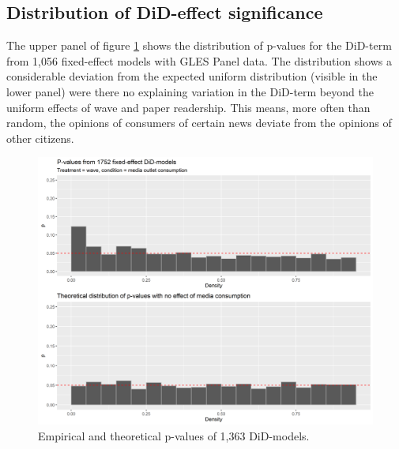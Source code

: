 \documentclass{article}
\begin{document}
\subsection{Distribution of DiD-effect significance}

The upper panel of figure \ref{fig:p_values} shows the distribution of p-values for the DiD-term from 1,056 fixed-effect models with GLES Panel data. The distribution shows a considerable deviation from the expected uniform distribution (visible in the lower panel) were there no explaining variation in the DiD-term beyond the uniform effects of wave and paper readership. This means, more often than random, the opinions of consumers of certain news deviate from the opinions of other citizens.

\begin{figure}[!ht]
    \centering
    \includegraphics[width=\textwidth]{paper/vis/DiD_model_ps.png}
    \caption{Empirical and theoretical p-values of 1,363 DiD-models.}
    \label{fig:p_values}
\end{figure}
\end{document}
